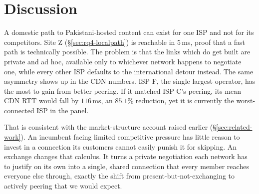 \documentclass[sigconf,anonymous,10pt]{acmart}
\begin{document}

\section{Discussion}
\label{sec:discussion}
A domestic path to Pakistani-hosted content can exist for one ISP and not for its competitors. Site Z (\S\ref{sec:rq4-localpath}) is reachable in $5$\,ms, proof that a fast path is technically possible. The problem is that the links which do get built are private and ad hoc, available only to whichever network happens to negotiate one, while every other ISP defaults to the international detour instead. The same asymmetry shows up in the CDN numbers. ISP F, the single largest operator, has the most to gain from better peering. If it matched ISP C's peering, its mean CDN RTT would fall by $116$\,ms, an $85.1$\% reduction, yet it is currently the worst-connected ISP in the panel.

That is consistent with the market-structure account raised earlier (\S\ref{sec:related-work}). An incumbent facing limited competitive pressure has little reason to invest in a connection its customers cannot easily punish it for skipping. An exchange changes that calculus. It turns a private negotiation each network has to justify on its own into a single, shared connection that every member reaches everyone else through, exactly the shift from present-but-not-exchanging to actively peering that we would expect.


\end{document}
